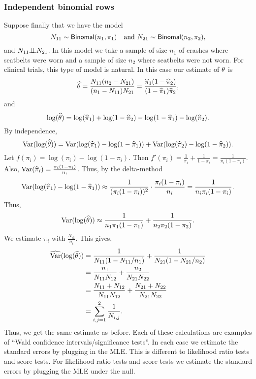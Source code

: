 \subsubsection{Independent binomial rows}
Suppose finally that we have the model
\[N_{11} \sim \mathsf{Binomal}(n_1, \pi_1) ~~ \text{ and } N_{21} \sim \mathsf{Binomal}(n_2, \pi_2), \]
and $N_{11} {\perp\!\!\!\perp} N_{21}$. In this model we take a sample of size $n_1$ of crashes where seatbelts were worn and a sample of size $n_2$ where seatbelts were not worn. For clinical trials, this type of model is natural. In this case our estimate of ${\theta}$ is 
\[\widehat{{\theta}} = \frac{N_{11}(n_2-N_{21})}{(n_1-N_{11})N_{21}} = \frac{\widehat{\pi}_1(1-\widehat{\pi}_2)}{(1-\widehat{\pi}_1)\widehat{\pi}_2}, \]
and 
\[\log(\widehat{{\theta}}) = \log(\widehat{\pi}_{1})+\log(1-\widehat{\pi}_{2}) - \log(1-\widehat{\pi}_{1})-\log(\widehat{\pi}_{2}). \]
By independence,
\[\operatorname{Var}(\log(\widehat{{\theta}})) = \operatorname{Var}(\log(\widehat{\pi}_{1})-\log(1-\widehat{\pi}_{1}))+\operatorname{Var}(\log(\widehat{\pi}_{2})-\log(1-\widehat{\pi}_{2})). \]
Let $f(\pi_i) = \log(\pi_i)-\log(1-\pi_i)$. Then $f'(\pi_i) = \frac{1}{\pi_i}+\frac{1}{1-\pi_i}=\frac{1}{\pi_i(1-\pi_i)}$. Also, $\operatorname{Var}(\widehat{\pi}_i) = \frac{\pi_i(1-\pi_i)}{n_i}$. Thus, by the delta-method
\[\operatorname{Var}(\log(\widehat{\pi}_{1})-\log(1-\widehat{\pi}_{1})) \approx \frac{1}{(\pi_i(1-\pi_i))^2} \cdot \frac{\pi_i(1-\pi_i)}{n_i} = \frac{1}{n_i\pi_i(1-\pi_i)}. \]
Thus,
\[\operatorname{Var}(\log(\widehat{{\theta}})) \approx \frac{1}{n_1\pi_1(1-\pi_1)}+\frac{1}{n_2\pi_2(1-\pi_2)}.\]
We estimate $\pi_i$ with $\frac{N_{i1}}{n_i}$. This gives,
\begin{align*}
    \widehat{\operatorname{Var}}(\log(\widehat{{\theta}})) &= \frac{1}{N_{11}(1-N_{11}/n_1)}+\frac{1}{N_{21}(1-N_{21}/n_2)} \\
    &= \frac{n_1}{N_{11}N_{12}}+\frac{n_2}{N_{21}N_{22}}\\
    &=\frac{N_{11}+N_{12}}{N_{11}N_{12}}+\frac{N_{21}+N_{22}}{N_{21}N_{22}}\\
    &=\sum_{i,j=1}^2 \frac{1}{N_{i,j}}.
\end{align*}
Thus, we get the same estimate as before. Each of these calculations are examples of ``Wald confidence intervals/significance tests''. In each case we estimate the standard errors by plugging in the MLE. This is different to likelihood ratio tests and score tests. For likelihood ratio tests and score tests we estimate the standard errors by plugging the MLE under the null.
